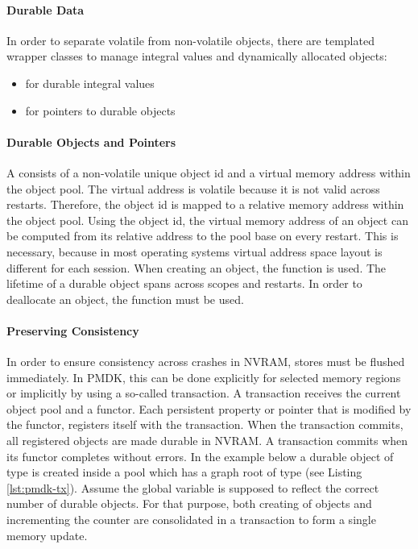 \paragraph{Durable Data}

In order to separate volatile from non-volatile objects, there are templated
wrapper classes to manage integral values and dynamically allocated objects:

\begin{itemize}
    \item {} for durable integral values
    \item {} for pointers to durable objects
\end{itemize}

\paragraph{Durable Objects and Pointers}

A  consists of a non-volatile unique object id and a
virtual memory address within the object pool. The virtual address is volatile
because it is not valid across restarts. Therefore, the object id is mapped to a
relative memory address within the object pool. Using the object id, the virtual
memory address of an object can be computed from its relative address to the
pool base on every restart. This is necessary, because in most operating systems
virtual address space layout is different for each session. When creating an
object, the function  is used. The lifetime of
a durable object spans across scopes and restarts. In order to deallocate an
object, the function  must be used.

\paragraph{Preserving Consistency}

In order to ensure consistency across crashes in NVRAM, stores must be flushed
immediately. In PMDK, this can be done explicitly for selected memory regions or
implicitly by using a so-called transaction. A transaction receives the current
object pool and a functor. Each persistent property or pointer that is modified
by the functor, registers itself with the transaction. When the transaction
commits, all registered objects are made durable in NVRAM. A transaction commits
when its functor completes without errors. In the example below a durable object
of type  is created inside a pool which has a graph root of type
 (see Listing \ref{lst:pmdk-tx}). Assume the global variable
 is supposed to reflect the correct number of durable objects.
For that purpose, both creating of objects and incrementing the counter are
consolidated in a transaction to form a single memory update.

